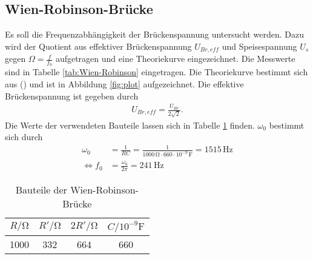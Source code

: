 \subsection{Wien-Robinson-Brücke}
Es soll die Frequenzabhängigkeit der Brückenspannung untersucht werden. Dazu wird der Quotient aus effektiver Brückenspannung $U_{Br,eff}$ und Speisespannung $U_s$
gegen $\Omega = \frac{f}{f_0}$ aufgetragen und eine Theoriekurve eingezeichnet. Die Messwerte sind in Tabelle \ref{tab:Wien-Robinson} eingetragen.
Die Theoriekurve bestimmt sich aus () und ist in Abbildung \ref{fig:plot} aufgezeichnet. Die effektive Brückenspannung ist gegeben durch
\begin{align*}
  U_{Br,eff} = \frac{U_{Br}}{2\sqrt{2}}.
\end{align*}
Die Werte der verwendeten Bauteile lassen sich in Tabelle \ref{tab:Bauteile} finden. $\omega_0$ bestimmt sich durch
\begin{align*}
  \omega_0 &= \frac{1}{RC} = \frac{1}{1000\,\unit{\ohm}\cdot 660 \cdot 10^{-9} \,\unit{\farad}} = 1515\,\unit{\hertz} \\
  \iff f_0 &= \frac{\omega_0}{2\pi} = 241\,\unit{\hertz}
\end{align*}

\begin{table}
  \centering
  \caption{Bauteile der Wien-Robinson-Brücke}
  \label{tab:Bauteile}
  \begin{tabular}{c c c c}
    \toprule
    $R/\unit{\ohm}$ & $R'/\unit{\ohm}$ & $2R'/\unit{\ohm}$ & $C/10^{-9}\unit{\farad}$ \\
    \midrule
    1000 & 332 & 664 & 660 \\
    \bottomrule
  \end{tabular}
\end{table}

